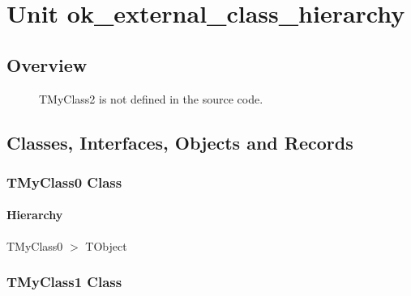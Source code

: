 \documentclass{report}
\newif\ifpdf
\begin{document}
\label{toc}\tableofcontents
\newpage
\newlength{\tmplength}
\chapter{Unit ok{\_}external{\_}class{\_}hierarchy}
\label{ok_external_class_hierarchy}
\section{Overview}
\begin{description}
\item[\texttt{\begin{ttfamily}TMyClass0\end{ttfamily} Class}]
\item[\texttt{\begin{ttfamily}TMyClass1\end{ttfamily} Class}]
\item[\texttt{\begin{ttfamily}TMyClass3\end{ttfamily} Class}]TMyClass2 is not defined in the source code.
\end{description}
\section{Classes, Interfaces, Objects and Records}
\ifpdf
\subsection*{\large{\textbf{TMyClass0 Class}}\normalsize\hspace{1ex}\hrulefill}
\else
\subsection*{TMyClass0 Class}
\fi
\label{ok_external_class_hierarchy.TMyClass0}
\subsubsection*{\large{\textbf{Hierarchy}}\normalsize\hspace{1ex}\hfill}
TMyClass0 {$>$} TObject
\ifpdf
\subsection*{\large{\textbf{TMyClass1 Class}}\normalsize\hspace{1ex}\hrulefill}
\else
\end{document}
